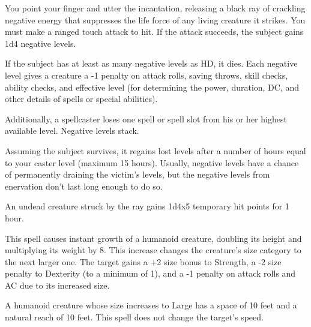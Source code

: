 \begin{multicols}{2}
\begin{small}
\noindent You point your finger and utter the incantation, releasing a black ray of crackling negative energy that suppresses the life force of any living creature it strikes. You must make a ranged touch attack to hit. If the attack succeeds, the subject gains 1d4 negative levels.

\smallskip\noindent If the subject has at least as many negative levels as HD, it dies. Each negative level gives a creature a -1 penalty on attack rolls, saving throws, skill checks, ability checks, and effective level (for determining the power, duration, DC, and other details of spells or special abilities).

\smallskip\noindent Additionally, a spellcaster loses one spell or spell slot from his or her highest available level. Negative levels stack.

\smallskip\noindent Assuming the subject survives, it regains lost levels after a number of hours equal to your caster level (maximum 15 hours). Usually, negative levels have a chance of permanently draining the victim's levels, but the negative levels from enervation don't last long enough to do so.

\smallskip\noindent An undead creature struck by the ray gains 1d4x5 temporary hit points for 1 hour.

\noindent This spell causes instant growth of a humanoid creature, doubling its height and multiplying its weight by 8. This increase changes the creature's size category to the next larger one. The target gains a +2 size bonus to Strength, a -2 size penalty to Dexterity (to a minimum of 1), and a -1 penalty on attack rolls and AC due to its increased size.

\smallskip\noindent A humanoid creature whose size increases to Large has a space of 10 feet and a natural reach of 10 feet. This spell does not change the target's speed.


\end{small}
\end{multicols}
